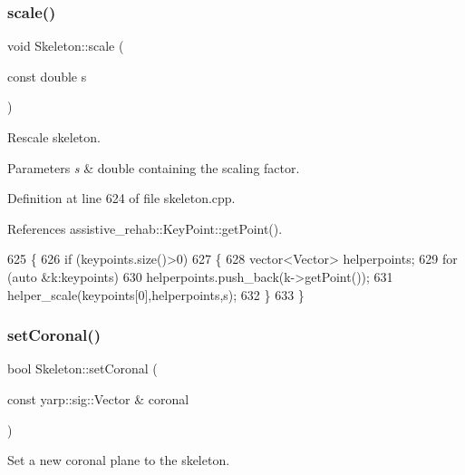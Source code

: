 \subsubsection{\texorpdfstring{scale()}{scale()}}
{\footnotesize\ttfamily void Skeleton\+::scale (\begin{DoxyParamCaption}\item[{const double}]{s }\end{DoxyParamCaption})\hspace{0.3cm}{\ttfamily [inherited]}}



Rescale skeleton. 


\begin{DoxyParams}{Parameters}
{\em s} & double containing the scaling factor. \\
\hline
\end{DoxyParams}


Definition at line 624 of file skeleton.\+cpp.



References assistive\+\_\+rehab\+::\+Key\+Point\+::get\+Point().


\begin{DoxyCode}
625 \{
626     \textcolor{keywordflow}{if} (keypoints.size()>0)
627     \{
628         vector<Vector> helperpoints;
629         \textcolor{keywordflow}{for} (\textcolor{keyword}{auto} &k:keypoints)
630             helperpoints.push\_back(k->getPoint());
631         helper\_scale(keypoints[0],helperpoints,s);
632     \}
633 \}
\end{DoxyCode}
\mbox{\label{classassistive__rehab_1_1Skeleton_ab3bd697f48ea69cfdc5ff7574c19041f}} 
\subsubsection{\texorpdfstring{set\+Coronal()}{setCoronal()}}
{\footnotesize\ttfamily bool Skeleton\+::set\+Coronal (\begin{DoxyParamCaption}\item[{const yarp\+::sig\+::\+Vector \&}]{coronal }\end{DoxyParamCaption})\hspace{0.3cm}{\ttfamily [inherited]}}



Set a new coronal plane to the skeleton. 


